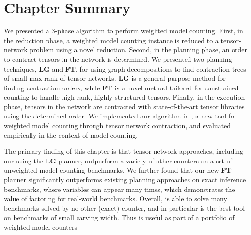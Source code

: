 \section{Chapter Summary} \label{sec:tensors:conclusion}
We presented a 3-phase algorithm to perform weighted model counting. First, in the reduction phase, a weighted model counting instance is reduced to a tensor-network problem using a novel reduction. Second, in the planning phase, an order to contract tensors in the network is determined. We presented two planning techniques, \textbf{LG} and \textbf{FT}, for using graph decompositions to find contraction trees of small max rank of tensor networks. \textbf{LG} is a general-purpose method for finding contraction orders, while \textbf{FT} is a novel method tailored for constrained counting to handle high-rank, highly-structured tensors. Finally, in the execution phase, tensors in the network are contracted with state-of-the-art tensor libraries using the determined order.
We implemented our algorithm in , a new tool for weighted model counting through tensor network contraction, and evaluated  empirically in the context of model counting.

{ \color{blue}
The primary finding of this chapter is that tensor network approaches, including our  using the \textbf{LG} planner, outperform a variety of other counters on a set of unweighted model counting benchmarks.
We further found that our new \textbf{FT} planner significantly outperforms existing planning approaches on exact inference benchmarks, where variables can appear many times, which demonstrates the value of factoring for real-world benchmarks.
Overall,  is able to solve many benchmarks solved by no other (exact) counter, and in particular  is the best tool on benchmarks of small carving width.
Thus  is useful as part of a portfolio of weighted model counters.
} %

